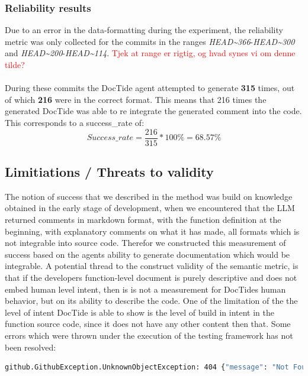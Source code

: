 \subsubsection{Reliability results}
\label{sec:suc_results}

Due to an error in the data-formatting during the experiment, the reliability metric was only collected for the commits in the ranges \textit{HEAD\textasciitilde366}-\textit{HEAD\textasciitilde300} and  \textit{HEAD\textasciitilde200}-\textit{HEAD\textasciitilde114}. \textcolor{red}{Tjek at range er rigtig, og hvad synes vi om denne tilde?}
\\ \\
During these commits the DocTide agent attempted to generate \textbf{315} times, out of which \textbf{216} were in the correct format. This means that 216 times the generated DocTide was able to re integrate the generated comment into the code. This corresponds to a success\_rate of:
\[
Success\_rate=\frac{216}{315}*100\% = 68.57\%
\]

\subsection{Limitiations / Threats to validity}
The notion of success that we described in the method  was build on knowledge obtained in the early stage of development, when we encountered that the LLM returned comments in markdown format, with the function definition at the beginning, with explanatory comments on what it has made, all formats which is not integrable into source code. Therefor we constructed this measurement of success based on the agents ability to generate documentation which would be integrable.
A potential thread to the construct validity of the semantic metric, is that if the developers function-level document is purely descriptive and does not embed human level intent, then is is not a measurement for DocTides human behavior, but on its ability to describe the code. One of the limitation of the the level of intent DocTide is able to show is the level of build in intent in the function source code, since it does not have any other content then that. Some errors which were thrown under the execution of the testing framework has not been resolved:
\begin{lstlisting}[language=bash, label={lst:unresolved_errors}, caption=Unresloved errors ]
    github.GithubException.UnknownObjectException: 404 {"message": "Not Found", "documentation_url": "https://docs.github.com/rest/repos/contents#get-repository-content", "status": "404"}
\end{lstlisting}

